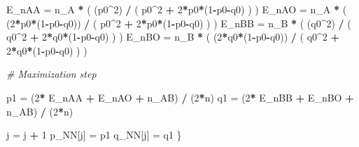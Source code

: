 \documentclass[]{article}
\newenvironment{Shaded}{\begin{snugshade}}{\end{snugshade}}
\newcommand{\DecValTok}[1]{\textcolor[rgb]{0.00,0.00,0.81}{#1}}
\newcommand{\StringTok}[1]{\textcolor[rgb]{0.31,0.60,0.02}{#1}}
\newcommand{\CommentTok}[1]{\textcolor[rgb]{0.56,0.35,0.01}{\textit{#1}}}
\newcommand{\OperatorTok}[1]{\textcolor[rgb]{0.81,0.36,0.00}{\textbf{#1}}}
\newcommand{\NormalTok}[1]{#1}
\begin{document}
\begin{Shaded}
\begin{Highlighting}[]
\NormalTok{              E_nAA =}\StringTok{ }\NormalTok{n_A }\OperatorTok{*}\StringTok{ }\NormalTok{( (p0}\OperatorTok{^}\DecValTok{2}\NormalTok{) }\OperatorTok{/}\StringTok{ }\NormalTok{( p0}\OperatorTok{^}\DecValTok{2} \OperatorTok{+}\StringTok{ }\DecValTok{2}\OperatorTok{*}\NormalTok{p0}\OperatorTok{*}\NormalTok{(}\DecValTok{1}\OperatorTok{-}\NormalTok{p0}\OperatorTok{-}\NormalTok{q0) ) )}
\NormalTok{              E_nAO =}\StringTok{ }\NormalTok{n_A }\OperatorTok{*}\StringTok{ }\NormalTok{( (}\DecValTok{2}\OperatorTok{*}\NormalTok{p0}\OperatorTok{*}\NormalTok{(}\DecValTok{1}\OperatorTok{-}\NormalTok{p0}\OperatorTok{-}\NormalTok{q0)) }\OperatorTok{/}\StringTok{ }\NormalTok{( p0}\OperatorTok{^}\DecValTok{2} \OperatorTok{+}\StringTok{ }\DecValTok{2}\OperatorTok{*}\NormalTok{p0}\OperatorTok{*}\NormalTok{(}\DecValTok{1}\OperatorTok{-}\NormalTok{p0}\OperatorTok{-}\NormalTok{q0) ) )}
\NormalTok{              E_nBB =}\StringTok{ }\NormalTok{n_B }\OperatorTok{*}\StringTok{ }\NormalTok{( (q0}\OperatorTok{^}\DecValTok{2}\NormalTok{) }\OperatorTok{/}\StringTok{ }\NormalTok{( q0}\OperatorTok{^}\DecValTok{2} \OperatorTok{+}\StringTok{ }\DecValTok{2}\OperatorTok{*}\NormalTok{q0}\OperatorTok{*}\NormalTok{(}\DecValTok{1}\OperatorTok{-}\NormalTok{p0}\OperatorTok{-}\NormalTok{q0) ) )}
\NormalTok{              E_nBO =}\StringTok{ }\NormalTok{n_B }\OperatorTok{*}\StringTok{ }\NormalTok{( (}\DecValTok{2}\OperatorTok{*}\NormalTok{q0}\OperatorTok{*}\NormalTok{(}\DecValTok{1}\OperatorTok{-}\NormalTok{p0}\OperatorTok{-}\NormalTok{q0)) }\OperatorTok{/}\StringTok{ }\NormalTok{( q0}\OperatorTok{^}\DecValTok{2} \OperatorTok{+}\StringTok{ }\DecValTok{2}\OperatorTok{*}\NormalTok{q0}\OperatorTok{*}\NormalTok{(}\DecValTok{1}\OperatorTok{-}\NormalTok{p0}\OperatorTok{-}\NormalTok{q0) ) )}
              
              \CommentTok{# Maximization step}
              
\NormalTok{              p1 =}\StringTok{ }\NormalTok{(}\DecValTok{2}\OperatorTok{*}\StringTok{ }\NormalTok{E_nAA }\OperatorTok{+}\StringTok{ }\NormalTok{E_nAO }\OperatorTok{+}\StringTok{ }\NormalTok{n_AB) }\OperatorTok{/}\StringTok{ }\NormalTok{(}\DecValTok{2}\OperatorTok{*}\NormalTok{n) }
\NormalTok{              q1 =}\StringTok{ }\NormalTok{(}\DecValTok{2}\OperatorTok{*}\StringTok{ }\NormalTok{E_nBB }\OperatorTok{+}\StringTok{ }\NormalTok{E_nBO }\OperatorTok{+}\StringTok{ }\NormalTok{n_AB) }\OperatorTok{/}\StringTok{ }\NormalTok{(}\DecValTok{2}\OperatorTok{*}\NormalTok{n)}
              
\NormalTok{              j =}\StringTok{ }\NormalTok{j }\OperatorTok{+}\StringTok{ }\DecValTok{1}
\NormalTok{              p_NN[j] =}\StringTok{ }\NormalTok{p1}
\NormalTok{              q_NN[j] =}\StringTok{ }\NormalTok{q1}
\NormalTok{      \}}
      

\end{Highlighting}
\end{Shaded}
\end{document}
